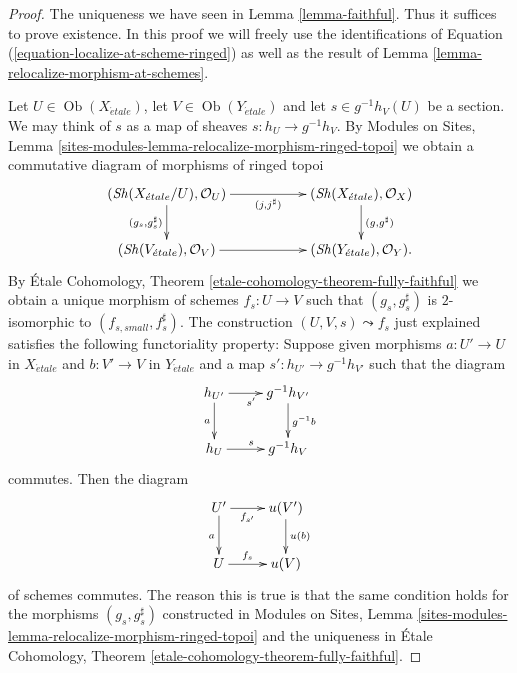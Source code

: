 \documentclass[10pt,a4paper]{amsart}
\theoremstyle{plain}
\theoremstyle{definition}
\theoremstyle{remark}
\numberwithin{equation}{subsection}
\def\Ob{\mathop{\mathrm{Ob}}\nolimits}
\def\Sh{\mathop{\mathit{Sh}}\nolimits}
\def\etale{{\acute{e}tale}}
\begin{document}
\begin{proof}
The uniqueness we have seen in
Lemma \ref{lemma-faithful}.
Thus it suffices to prove existence.
In this proof we will freely use the identifications of
Equation (\ref{equation-localize-at-scheme-ringed})
as well as the result of
Lemma \ref{lemma-relocalize-morphism-at-schemes}.

\medskip\noindent
Let $U \in \Ob(X_\etale)$, let
$V \in \Ob(Y_\etale)$
and let $s \in g^{-1}h_V(U)$ be a section. We may think of
$s$ as a map of sheaves $s : h_U \to g^{-1}h_V$. By
Modules on Sites,
Lemma \ref{sites-modules-lemma-relocalize-morphism-ringed-topoi}
we obtain a commutative diagram of morphisms of ringed topoi
$$
\xymatrix{
(\Sh(X_\etale/U), \mathcal{O}_U)
\ar[rr]_-{(j, j^\sharp)} \ar[d]_{(g_s, g_s^\sharp)} & &
(\Sh(X_\etale), \mathcal{O}_X) \ar[d]^{(g, g^\sharp)} \\
(\Sh(V_\etale), \mathcal{O}_V) \ar[rr] & &
(\Sh(Y_\etale), \mathcal{O}_Y).
}
$$
By
\'Etale Cohomology, Theorem \ref{etale-cohomology-theorem-fully-faithful}
we obtain a unique morphism of schemes $f_s : U \to V$ such that
$(g_s, g_s^\sharp)$ is $2$-isomorphic to $(f_{s, small}, f_s^\sharp)$.
The construction $(U, V, s) \leadsto f_s$ just explained satisfies
the following functoriality property: Suppose given morphisms
$a : U' \to U$ in $X_\etale$ and $b : V' \to V$ in $Y_\etale$
and a map $s' : h_{U'} \to g^{-1}h_{V'}$ such that the diagram
$$
\xymatrix{
h_{U'} \ar[d]_a \ar[r]_{s'} & g^{-1}h_{V'} \ar[d]^{g^{-1}b} \\
h_U \ar[r]^s & g^{-1}h_V
}
$$
commutes. Then the diagram
$$
\xymatrix{
U' \ar[r]_-{f_{s'}} \ar[d]_a & u(V') \ar[d]^{u(b)} \\
U \ar[r]^-{f_s} & u(V)
}
$$
of schemes commutes. The reason this is true is that the same condition
holds for the morphisms $(g_s, g_s^\sharp)$ constructed in
Modules on Sites,
Lemma \ref{sites-modules-lemma-relocalize-morphism-ringed-topoi}
and the uniqueness in
\'Etale Cohomology, Theorem \ref{etale-cohomology-theorem-fully-faithful}.


\end{proof}
\end{document}
